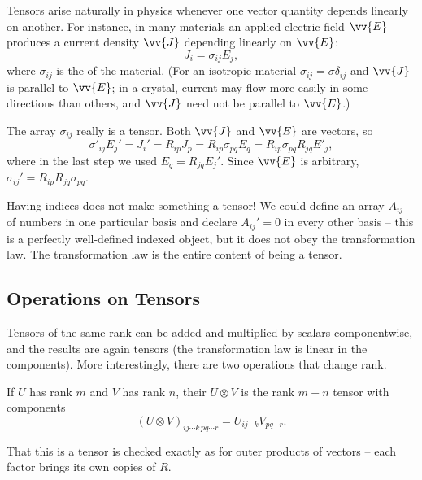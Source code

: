 \begin{example}
	Tensors arise naturally in physics whenever one vector quantity depends linearly on another. For instance, in many materials an applied electric field $\vv{E}$ produces a current density $\vv{J}$ depending linearly on $\vv{E}$:
	$$
	J_i = \sigma_{ij} E_j,
	$$
	where $\sigma_{ij}$ is the  of the material. (For an isotropic material $\sigma_{ij} = \sigma \delta_{ij}$ and $\vv{J}$ is parallel to $\vv{E}$; in a crystal, current may flow more easily in some directions than others, and $\vv{J}$ need not be parallel to $\vv{E}$.)

	The array $\sigma_{ij}$ really is a tensor. Both $\vv{J}$ and $\vv{E}$ are vectors, so
	$$
	\sigma'_{ij}E_j' = J_i' = R_{ip} J_p = R_{ip} \sigma_{pq} E_q = R_{ip}\sigma_{pq} R_{jq} E'_j,
	$$
	where in the last step we used $E_q = R_{jq}E_j'$. Since $\vv{E}$ is arbitrary, $\sigma_{ij}' = R_{ip}R_{jq}\sigma_{pq}$.
\end{example}

\begin{remark}
	Having indices does not make something a tensor! We could define an array $A_{ij}$ of numbers in one particular basis and declare $A_{ij}' = 0$ in every other basis -- this is a perfectly well-defined indexed object, but it does not obey the transformation law. The transformation law is the entire content of being a tensor.
\end{remark}

\subsection{Operations on Tensors}

Tensors of the same rank can be added and multiplied by scalars componentwise, and the results are again tensors (the transformation law is linear in the components). More interestingly, there are two operations that change rank.

\begin{definition}
	If $U$ has rank $m$ and $V$ has rank $n$, their  $U \otimes V$ is the rank $m + n$ tensor with components
	$$
	(U \otimes V)_{ij\cdots k \, pq \cdots r} = U_{ij \cdots k} V_{pq\cdots r}.
	$$
\end{definition}

That this is a tensor is checked exactly as for outer products of vectors -- each factor brings its own copies of $R$.

